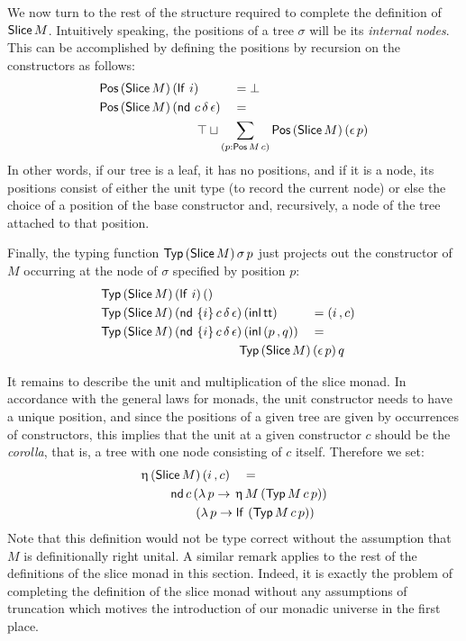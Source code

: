 We now turn to the rest of the structure required to complete the
definition of $\mathsf{Slice}\, M$.  Intuitively speaking, the positions of
a tree $\sigma$ will be its \emph{internal nodes}.  This can be
accomplished by defining the positions by recursion on the
constructors as follows:
\begin{align*}
  &\Pos (\Slice M)\, (\lf\, i) &&= \Empty \\
  &\Pos (\Slice M)\, (\nd\, c\, \delta\, \epsilon)
                               &&= \\
  &&&\hspace{-1cm} \Unit \sqcup \sum_{(p : \Pos M\, c)} \Pos (\Slice M)\, (\epsilon\, p)
\end{align*}
In other words, if our tree is a leaf, it has no positions, and if it
is a node, its positions consist of either the unit type (to record
the current node) or else the choice of a position of the base
constructor and, recursively, a node of the tree attached to that
position.

Finally, the typing function $\mathsf{Typ}\, (\mathsf{Slice}\, M)\, \sigma\, p$ just
projects out the constructor of $M$ occurring at the node of $\sigma$
specified by position $p$:
\begin{align*}
  &\Typ (\Slice M)\, (\lf\, i)\, () \\
  &\Typ (\Slice M)\, (\nd\, \{i\}\, c\, \delta\, \epsilon)\, (\inl \ttt) &&= (i \,, c) \\
  &\Typ (\Slice M)\, (\nd\, \{i\}\, c\, \delta\, \epsilon)\, (\inl (p \,, q)) &&= \\
  &&&\hspace{-2cm} \Typ (\Slice M)\, (\epsilon\, p)\, q
\end{align*}

It remains to describe the unit and multiplication of the slice monad.
In accordance with the general laws for monads, the unit constructor
needs to have a unique position, and since the positions of a given
tree are given by occurrences of constructors, this implies that
the unit at a given constructor $c$ should be the \emph{corolla},
that is, a tree with one node consisting of $c$ itself.  Therefore
we set:
\begin{align*}
  &\upeta\, (\Slice M)\, (i \,, c) &&= \\
  &&& \hspace{-2cm} \nd c\, (\lambda\, p \to\, \upeta\, M\, (\Typ M\, c\, p)) \\
  &&& \hspace{-1.3cm} (\lambda\, p \to \lf\, (\Typ M\, c\, p))
\end{align*}
Note that this definition would not be type correct without the
assumption that $M$ is definitionally right unital.  A similar remark
applies to the rest of the definitions of the slice monad in this
section.  Indeed, it is exactly the problem of completing the
definition of the slice monad without any assumptions of truncation
which motives the introduction of our monadic universe in the first
place.

